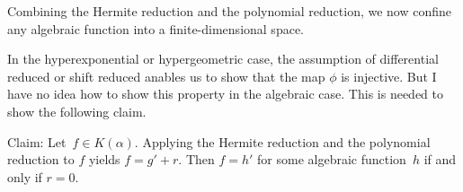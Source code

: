 \documentclass[a4paper,draft]{article}
\begin{document}
{Combining the Hermite reduction and the polynomial reduction, we now confine any algebraic function
into a finite-dimensional space.

In the hyperexponential or hypergeometric case, the assumption of differential reduced or shift reduced anables
us to show that the map $\phi$ is injective. But I have no idea how to show this property in the algebraic case.
This is needed to show the following claim.

{Claim: Let~$f\in K(\alpha)$. Applying the Hermite reduction and the polynomial reduction to $f$ yields $f = g' + r$.
Then $f= h'$ for some algebraic function~$h$ if and only if $r=0$. }











 }
\end{document}
